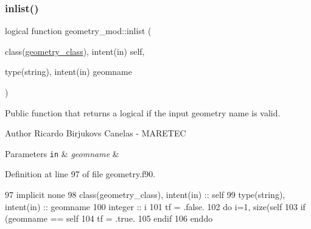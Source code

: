 \subsubsection{\texorpdfstring{inlist()}{inlist()}}
{\footnotesize\ttfamily logical function geometry\+\_\+mod\+::inlist (\begin{DoxyParamCaption}\item[{class(\mbox{\hyperlink{structgeometry__mod_1_1geometry__class}{geometry\+\_\+class}}), intent(in)}]{self,  }\item[{type(string), intent(in)}]{geomname }\end{DoxyParamCaption})\hspace{0.3cm}{\ttfamily [private]}}



Public function that returns a logical if the input geometry name is valid. 

\begin{DoxyAuthor}{Author}
Ricardo Birjukovs Canelas -\/ M\+A\+R\+E\+T\+EC
\end{DoxyAuthor}

\begin{DoxyParams}[1]{Parameters}
\mbox{\tt in}  & {\em geomname} & \\
\hline
\end{DoxyParams}


Definition at line 97 of file geometry.\+f90.


\begin{DoxyCode}
97     \textcolor{keywordtype}{implicit none}
98     \textcolor{keywordtype}{class}(geometry\_class), \textcolor{keywordtype}{intent(in)} :: self
99     \textcolor{keywordtype}{type}(string), \textcolor{keywordtype}{intent(in)} :: geomname
100     \textcolor{keywordtype}{integer} :: i
101     tf = .false.
102     \textcolor{keywordflow}{do} i=1, \textcolor{keyword}{size}(self%
103         \textcolor{keywordflow}{if} (geomname == self%
104             tf = .true.
105 \textcolor{keywordflow}{        endif}
106 \textcolor{keywordflow}{    enddo}
\end{DoxyCode}
\mbox{\label{namespacegeometry__mod_abcb09c0f5274c27cb79b0dd009ed94b3}} 
